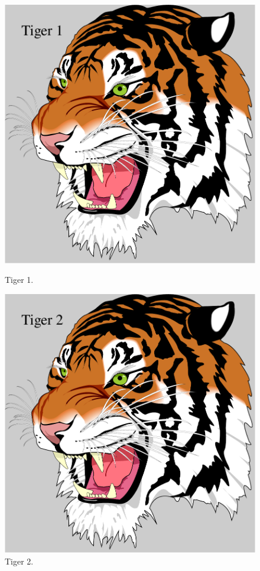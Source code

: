 \documentclass[a4paper,fleqn,dvipdfmx,12pt]{jsarticle}
\begin{document}
\begin{figure}[b]
	\centering
	\begin{minipage}{0.35\columnwidth}
		\centering
		\includegraphics[width=\columnwidth]{tiger1.pdf}
		\caption{Tiger 1.}
		\label{fig:abst1}
	\end{minipage}
	\hspace{15mm}
	\begin{minipage}{0.35\columnwidth}
		\centering
		\includegraphics[width=\columnwidth]{tiger2.pdf}
		\caption{Tiger 2.}
		\label{fig:abst2}
	\end{minipage}
\end{figure}

\end{document}
